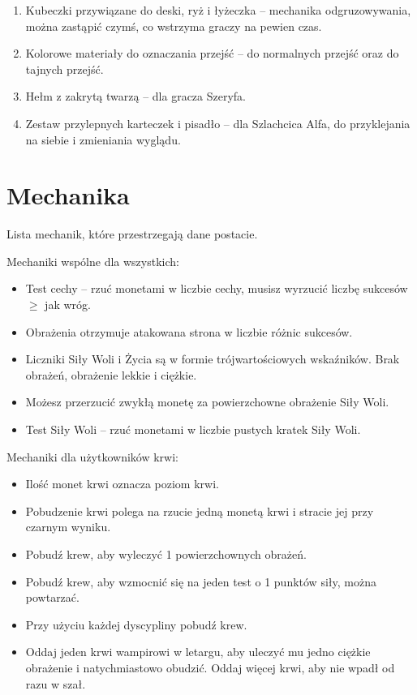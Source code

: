 \begin{enumerate}
		\item Kubeczki przywiązane do deski, ryż i łyżeczka -- mechanika odgruzowywania, można zastąpić czymś, co wstrzyma graczy na pewien czas.
		\item Kolorowe materiały do oznaczania przejść -- do normalnych przejść oraz do tajnych przejść.
		\item Hełm z zakrytą twarzą -- dla gracza Szeryfa.
		\item Zestaw przylepnych karteczek i pisadło -- dla Szlachcica Alfa, do przyklejania na siebie i zmieniania wyglądu.
	\end{enumerate}
	
\section{Mechanika}
	Lista mechanik, które przestrzegają dane postacie.
	
	Mechaniki wspólne dla wszystkich:
	\begin{itemize}
		\item Test cechy -- rzuć monetami w liczbie cechy, musisz wyrzucić liczbę sukcesów $\geqslant$ jak wróg.
		\item Obrażenia otrzymuje atakowana strona w liczbie różnic sukcesów.
		\item Liczniki Siły Woli i Życia są w formie trójwartościowych wskaźników. Brak obrażeń, obrażenie lekkie i ciężkie.
		\item Możesz przerzucić zwykłą monetę za powierzchowne obrażenie Siły Woli.
		\item Test Siły Woli -- rzuć monetami w liczbie pustych kratek Siły Woli.
	\end{itemize}

	Mechaniki dla użytkowników krwi:
	\begin{itemize}
		\item Ilość monet krwi oznacza poziom krwi.
		\item Pobudzenie krwi polega na rzucie jedną monetą krwi i stracie jej przy czarnym wyniku.
		\item Pobudź krew, aby wyleczyć 1 powierzchownych obrażeń.
		\item Pobudź krew, aby wzmocnić się na jeden test o 1 punktów siły, można powtarzać.
		\item Przy użyciu każdej dyscypliny pobudź krew.
		\item Oddaj jeden krwi wampirowi w letargu, aby uleczyć mu jedno ciężkie obrażenie i natychmiastowo obudzić. Oddaj więcej krwi, aby nie wpadł od razu w szał.
	\end{itemize}

